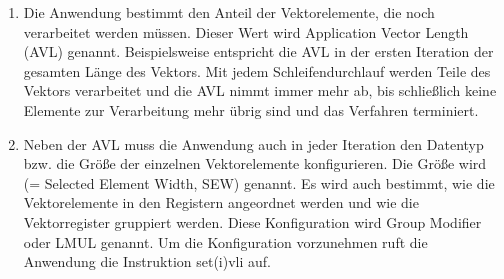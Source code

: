 \begin{enumerate}

    \item Die Anwendung bestimmt den Anteil der Vektorelemente, die noch verarbeitet werden müssen. Dieser Wert wird Application Vector Length (AVL) genannt. Beispielsweise entspricht die \gls{AVL} in der ersten Iteration der gesamten Länge des Vektors. Mit jedem Schleifendurchlauf werden Teile des Vektors verarbeitet und die AVL nimmt immer mehr ab, bis schließlich keine Elemente zur Verarbeitung mehr übrig sind und das Verfahren terminiert.


    \item Neben der \gls{AVL} muss die Anwendung auch in jeder Iteration den Datentyp bzw. die Größe der einzelnen Vektorelemente konfigurieren. Die Größe wird (= Selected Element Width, SEW) genannt. Es wird auch bestimmt, wie die Vektorelemente in den Registern angeordnet werden und wie die Vektorregister gruppiert werden. Diese Konfiguration wird Group Modifier oder LMUL genannt. Um die Konfiguration vorzunehmen ruft die Anwendung die Instruktion set(i)vli auf.



\end{enumerate}
